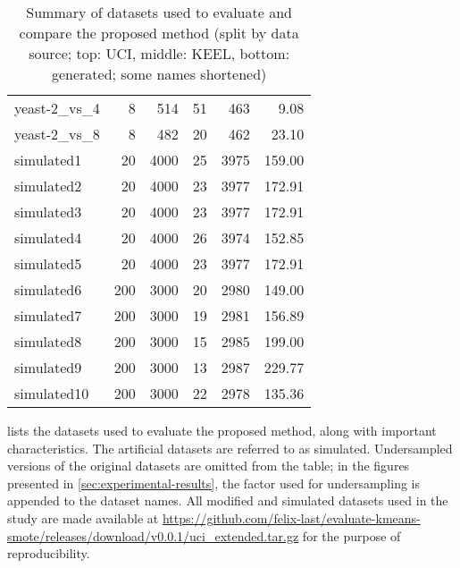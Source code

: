 \documentclass[sort&compress]{elsarticle}
\begin{document}
\begin{table}[!htb]
\begin{tabular}{lrrrrr}
				yeast-2\_vs\_4 &              8 &             514 &                       51 &                      463 &             9.08 \\
				yeast-2\_vs\_8 &              8 &             482 &                       20 &                      462 &            23.10 \\
			\midrule
				simulated1 &             20 &            4000 &                       25 &                     3975 &           159.00 \\
				simulated2 &             20 &            4000 &                       23 &                     3977 &           172.91 \\
				simulated3 &             20 &            4000 &                       23 &                     3977 &           172.91 \\
				simulated4 &             20 &            4000 &                       26 &                     3974 &           152.85 \\
				simulated5 &             20 &            4000 &                       23 &                     3977 &           172.91 \\
				simulated6 &            200 &            3000 &                       20 &                     2980 &           149.00 \\
				simulated7 &            200 &            3000 &                       19 &                     2981 &           156.89 \\
				simulated8 &            200 &            3000 &                       15 &                     2985 &           199.00 \\
				simulated9 &            200 &            3000 &                       13 &                     2987 &           229.77 \\
				simulated10 &            200 &            3000 &                       22 &                     2978 &           135.36 \\
			\bottomrule
			\end{tabular}
		\caption{Summary of datasets used to evaluate and compare the proposed method 
		(split by data source; top: UCI, middle: KEEL, bottom: generated; some names shortened)}
		\label{tab:datasets}
	\end{table}
	
	 lists the datasets used to evaluate the proposed method,
	along with important characteristics. The artificial datasets are referred
	to as simulated. Undersampled versions of the original datasets are omitted
	from the table; in the figures presented in \cref{sec:experimental-results},
	the factor used for undersampling is appended to the dataset names. All
	modified and simulated datasets used in the study are made available at
	\url{https://github.com/felix-last/evaluate-kmeans-smote/releases/download/v0.0.1/uci_extended.tar.gz}
	for the purpose of reproducibility.
\end{document}
